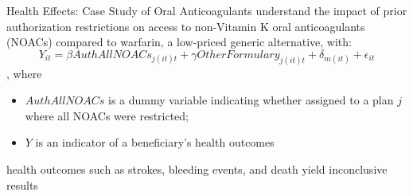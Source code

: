 \begin{frame}{Health Effects: Case Study of Oral Anticoagulants}
    understand the impact of prior authorization restrictions on access to non-Vitamin K oral anticoagulants (NOACs) compared to warfarin, a low-priced generic alternative, with:
    $$Y_{it}=\beta AuthAllNOACs_{j(it)t} + \gamma OtherFormulary_{j(it)t} + \delta_{m(it)} + \epsilon_{it} $$
    , where 
    \begin{itemize}
        \item $AuthAllNOACs$ is a dummy variable indicating whether assigned to a plan $j$ where all NOACs were restricted; 
        \item $Y$ is an indicator of a beneficiary’s health outcomes
    \end{itemize}
    health outcomes such as strokes, bleeding events, and death yield inconclusive results
\end{frame}